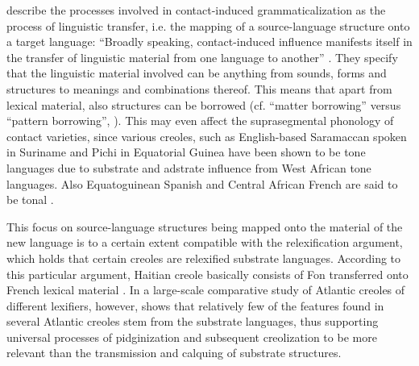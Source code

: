 \documentclass[output=paper]{langscibook}
\begin{document}
\citet{heineetal2005language} describe the processes involved in contact-induced grammaticalization as the process of linguistic transfer, i.e. the mapping of a source-language structure onto a target language: “Broadly speaking, contact-induced influence manifests itself in the transfer of linguistic material from one language to another” \citep[2]{heineetal2005language}. They specify that the linguistic material involved can be anything from sounds, forms and structures to meanings and combinations thereof. This means that apart from lexical material, also structures can be borrowed (cf. “matter borrowing” versus “pattern borrowing”, \citealt{matras_grammatical_2007}). This may even affect the suprasegmental phonology of contact varieties, since various creoles, such as English-based Saramaccan spoken in Suriname \parencite{good2004tone} and Pichi in Equatorial Guinea \citep{yakpo2018grammar} have been shown to be tone languages due to substrate and adstrate influence from West African tone languages. Also Equatoguinean Spanish and Central African French are said to be tonal \citep{bordaletal2020}.

This focus on source-language structures being mapped onto the material of the new language is to a certain extent compatible with the relexification argument, which holds that certain creoles are relexified substrate languages. According to this particular argument, Haitian creole basically consists of Fon transferred onto French lexical material \citep{lefebvre1993role}. In a large-scale comparative study of Atlantic creoles of different lexifiers, however, \citet{parkvall2000out} shows that relatively few of the features found in several Atlantic creoles stem from the substrate languages, thus supporting universal processes of pidginization and subsequent creolization to be more relevant than the transmission and calquing of substrate structures.
\end{document}
